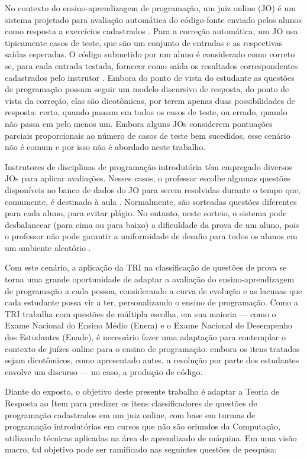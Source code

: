 \documentclass[12pt]{article}
\begin{document}
No contexto do ensino-aprendizagem de programação, um juiz online (JO) é um sistema projetado para avaliação automática do código-fonte enviado pelos alunos como resposta a exercícios cadastrados \cite{Wasik2018}. Para a correção automática, um JO usa tipicamente casos de teste, que são um conjunto de entradas e as respectivas saídas esperadas. O código submetido por um aluno é considerado como correto se, para cada entrada testada, fornecer como saída os resultados correspondentes cadastrados pelo instrutor \cite{elrik2022}. Embora do ponto de vista do estudante as questões de programação possam seguir um modelo discursivo de resposta, do ponto de vista da correção, elas são dicotômicas, por terem apenas duas possibilidades de resposta: certo, quando passam em todos os casos de teste, ou errado, quando não passa em pelo menos um. Embora alguns JOs considerem pontuações parciais proporcionais ao número de casos de teste bem sucedidos, esse cenário não é comum e por isso não é abordado neste trabalho.

Instrutores de disciplinas de programação introdutória têm empregado diversos JOs para aplicar avaliações. Nesses casos, o professor escolhe algumas questões disponíveis no banco de dados do JO para serem resolvidas durante o tempo que, comumente, é destinado à aula \cite{jackson2023}. Normalmente, são sorteadas questões diferentes para cada aluno, para evitar plágio. No entanto, neste sorteio, o sistema pode desbalancear (para cima ou para baixo) a dificuldade da prova de um aluno, pois o professor não pode garantir a uniformidade de desafio para todos os alunos em um ambiente aleatório \cite{marcos2021}.

Com este cenário, a aplicação da TRI na classificação de questões de prova se torna uma grande oportunidade de adaptar a avaliação do ensino-aprendizagem de programação a cada pessoa, considerando a curva de evolução e as lacunas que cada estudante possa vir a ter, personalizando o ensino de programação. Como a TRI trabalha com questões de múltipla escolha, em sua maioria --- como o Exame Nacional do Ensino Médio (Enem) e o Exame Nacional de Desempenho dos Estudantes (Enade), é necessário fazer uma adaptação para contemplar o contexto de juízes online para o ensino de programação: embora os itens tratados sejam dicotômicos, como apresentado antes, a resolução por parte dos estudantes envolve um discurso --- no caso, a produção de código.

Diante do exposto, o objetivo deste presente trabalho é adaptar a Teoria de Resposta ao Item para predizer os itens classificadores de questões de programação cadastrados em um juiz online, com base em turmas de programação introdutórias em cursos que não são oriundos da Computação, utilizando técnicas aplicadas na área de aprendizado de máquina. Em uma visão macro, tal objetivo pode ser ramificado nas seguintes questões de pesquisa:
\end{document}
